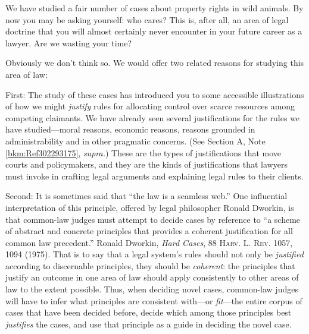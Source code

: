 We have studied a fair number of cases about property rights in wild animals. By
now you may be asking yourself: who cares? This is, after all, an area of legal
doctrine that you will almost certainly never encounter in your future career as
a lawyer. Are we wasting your time?

Obviously we don't think so. We would offer two related reasons for studying
this area of law: 

First: The study of these cases has introduced you to some accessible
illustrations of how we might \textit{justify} rules for allocating control over
scarce resources among competing claimants. We have already seen several
justifications for the rules we have studied---moral reasons, economic reasons,
reasons grounded in administrability and in other pragmatic concerns. (See
Section A, Note \ref{bkm:Ref302293175}, \textit{supra.}) These are the types of
justifications that move courts and policymakers, and they are the kinds of
justifications that lawyers must invoke in crafting legal arguments and
explaining legal rules to their clients. 

Second: It is sometimes said that ``the law is a seamless web.'' One influential
interpretation of this principle, offered by legal philosopher Ronald Dworkin,
is that common-law judges must attempt to decide cases by reference to ``a
scheme of abstract and concrete principles that provides a coherent
justification for all common law precedent.'' Ronald Dworkin, \textit{Hard
Cases}, 88 \textsc{Harv. L. Rev.} 1057, 1094 (1975). That is to say that a legal
system's rules should not only be \textit{justified} according to discernable
principles, they should be \textit{coherent}: the principles that justify an
outcome in one area of law should apply consistently to other areas of law to
the extent possible. Thus, when deciding novel cases, common-law judges will
have to infer what principles are consistent with---or \textit{fit}---the entire
corpus of cases that have been decided before, decide which among those
principles best \textit{justifies} the cases, and use that principle as a guide
in deciding the novel case.



